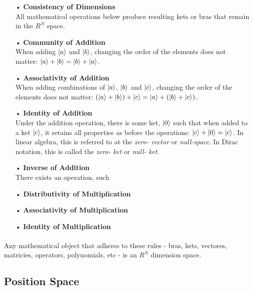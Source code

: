 \documentclass[12pt,letterpaper]{book}
\begin{document}
\begin{enumerate}
\item[•]\textbf{Consistency of Dimensions}\\
All mathematical operations below produce resulting kets or bras that remain in the $R^N$ space.
\item[•]\textbf{Community of Addition}\\
When adding $\ket{a}$ and $\ket{b}$, changing the order of the elements does not matter: 
$\ket{a} + \ket{b} = \ket{b} + \ket{a}$. 
\item[•]\textbf{Associativity of Addition}\\
When adding combinations of $\ket{a}$, $\ket{b}$ and $\ket{c}$, changing the order of the elements does not matter:
$(\ket{a} + \ket{b}) + \ket{c} = \ket{a} + (\ket{b} + \ket{c})$.
\item[•]\textbf{Identity of Addition}\\
Under the addition operation, there is some ket, $\ket{0}$ such that when added to a ket $\ket{c}$, it retains all properties as before the operations: $\ket{c} + \ket{0} = \ket{c}$. In linear algebra, this is referred to at the \textit{zero- vector} or \textit{null-space}. In Dirac notation, this is called the \textit{zero- ket} or \textit{null- ket}.
\item[•]\textbf{Inverse of Addition}\\
There exists an operation, such 
\item[•]\textbf{Distributivity of Multiplication }\\

\item[•]\textbf{Associativity of Multiplication}\\

\item[•]\textbf{Identity of Multiplication}\\


\end{enumerate}
\paragraph*{}Any mathematical object that adheres to these rules - bras, kets, vectores, matricies, operators, polynomials, etc - is an $R^N$ dimension space.


\subsection*{Position Space}
\end{document}
